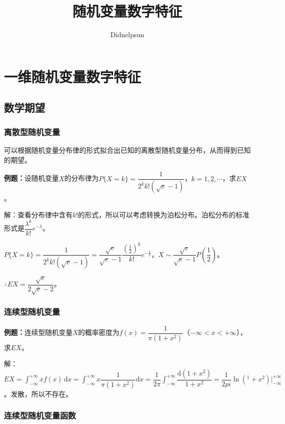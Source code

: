 \documentclass[UTF8, 12pt]{ctexart}
\author{Didnelpsun}
\title{随机变量数字特征}
\date{}
\begin{document}
\maketitle
\pagestyle{empty}
\thispagestyle{empty}
\tableofcontents
\thispagestyle{empty}
\newpage
\pagestyle{plain}
\setcounter{page}{1}
\section{一维随机变量数字特征}

\subsection{数学期望}

\subsubsection{离散型随机变量}

可以根据随机变量分布律的形式拟合出已知的离散型随机变量分布，从而得到已知的期望。

\textbf{例题：}设随机变量$X$的分布律为$P\{X=k\}=\dfrac{1}{2^kk!(\sqrt{e}-1)}$，$k=1,2,\cdots$，求$EX$。

解：查看分布律中含有$k!$的形式，所以可以考虑转换为泊松分布。泊松分布的标准形式是$\dfrac{\lambda^k}{k!}e^{-\lambda}$。

$P\{X=k\}=\dfrac{1}{2^kk!(\sqrt{e}-1)}=\dfrac{\sqrt{e}}{\sqrt{e}-1}\dfrac{\left(\frac{1}{2}\right)^k}{k!}e^{-\frac{1}{2}}$，$X\sim\dfrac{\sqrt{e}}{\sqrt{e}-1}P\left(\dfrac{1}{2}\right)$。

$\therefore EX=\dfrac{\sqrt{e}}{2\sqrt{e}-2}$。

\subsubsection{连续型随机变量}

\textbf{例题：}连续型随机变量$X$的概率密度为$f(x)=\dfrac{1}{\pi(1+x^2)}$（$-\infty<x<+\infty$），求$EX$。

解：$EX=\int_{-\infty}^{+\infty}xf(x)\,\textrm{d}x=\int_{-\infty}^{+\infty}x\dfrac{1}{\pi(1+x^2)}\textrm{d}x=\dfrac{1}{2\pi}\int_{-\infty}^{+\infty}\dfrac{\textrm{d}(1+x^2)}{1+x^2}=\dfrac{1}{2pi}\ln(^1+x^2)|_{-\infty}^{+\infty}$。发散，所以不存在。

\subsubsection{连续型随机变量函数}
\end{document}
